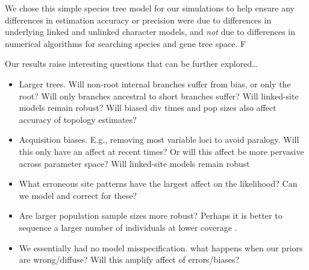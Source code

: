 

We chose this simple species tree model for our simulations to help ensure any
differences in estimation accuracy or precision were due to differences in
underlying linked and unlinked character models,
and \emph{not} due to differences in numerical algorithms for searching species
and gene tree space.
F

Our results raise interesting questions that can be further explored\ldots
\begin{itemize}
    \item Larger trees. Will non-root internal branches suffer from bias, or
        only the root? Will only branches ancestral to short branches suffer?
        Will linked-site models remain robust?
        Will biased div times and pop sizes also affect accuracy of topology
        estimates?
    \item Acquisition biases. E.g., removing most variable loci to avoid
        paralogy. Will this only have an affect at recent times? Or will
        this affect be more pervasive across parameter space?
        Will linked-site models remain robust
    \item What erroneous site patterns have the largest affect on
        the likelihood? Can we model and correct for these?
    \item Are larger population sample sizes more robust? Perhaps it is better
        to sequence a larger number of individuals at lower coverage 
        \cite{fumagalliAssessingEffectSequencing2013}.
    \item We essentially had no model misspecification.
        what happens when our priors are wrong/diffuse?
        Will this amplify affect of errors/biases?
\end{itemize}

